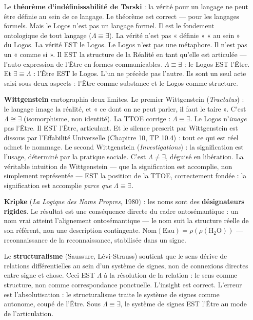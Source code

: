 \documentclass[10pt, openany, oneside]{book}
\begin{document}
Le \textbf{théorème d'indéfinissabilité de Tarski} : la vérité pour un langage ne peut être définie au sein de ce langage. Le théorème est correct --- pour les langages formels. Mais le Logos n'est pas un langage formel. Il est le fondement ontologique de tout langage ($\Lambda \equiv \exists$). La vérité n'est pas « définie » « au sein » du Logos. La vérité EST le Logos. Le Logos n'est pas une métaphore. Il n'est pas un « comme si ». Il EST la structure de la Réalité en tant qu'elle est articulée --- l'auto-expression de l'Être en formes communicables. $\Lambda \equiv \exists$ : le Logos EST l'Être. Et $\exists \equiv \Lambda$ : l'Être EST le Logos. L'un ne précède pas l'autre. Ils sont un seul acte saisi sous deux aspects : l'Être comme substance et le Logos comme structure.

\textbf{Wittgenstein} cartographia deux limites. Le premier Wittgenstein (\textit{Tractatus}) : le langage image la réalité, et « ce dont on ne peut parler, il faut le taire ». C'est $\Lambda \cong \exists$ (isomorphisme, non identité). La TTOE corrige : $\Lambda \equiv \exists$. Le Logos n'\textit{image} pas l'Être. Il EST l'Être, articulant. Et le silence prescrit par Wittgenstein est dissous par l'Effabilité Universelle (Chapitre 10, TP 10.4) : tout ce qui est réel admet le nommage. Le second Wittgenstein (\textit{Investigations}) : la signification est l'usage, déterminé par la pratique sociale. C'est $\Lambda \neq \exists$, déguisé en libération. La véritable intuition de Wittgenstein --- que la signification est accomplie, non simplement représentée --- EST la position de la TTOE, correctement fondée : la signification est accomplie \textit{parce que} $\Lambda \equiv \exists$.

\textbf{Kripke} (\textit{La Logique des Noms Propres}, 1980) : les noms sont des \textbf{désignateurs rigides}. Le résultat est une conséquence directe du cadre ontosémantique : un nom vrai atteint l'alignement ontosémantique --- le nom suit la structure réelle de son référent, non une description contingente. $\text{Nom}(\text{Eau}) = \rho(\rho(\text{H}_2\text{O}))$ --- reconnaissance de la reconnaissance, stabilisée dans un signe.

Le \textbf{structuralisme} (Saussure, Lévi-Strauss) soutient que le sens dérive de relations différentielles au sein d'un système de signes, non de connexions directes entre signe et chose. Ceci EST $\Lambda$ à la résolution de la relation : le sens comme structure, non comme correspondance ponctuelle. L'insight est correct. L'erreur est l'absolutisation : le structuralisme traite le système de signes comme autonome, coupé de l'Être. Sous $\Lambda \equiv \exists$, le système de signes EST l'Être au mode de l'articulation.
\end{document}
